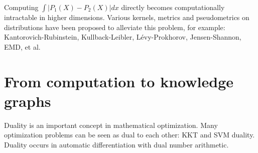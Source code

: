 \documentclass[11pt]{article}
\begin{document}
    \begin{figure}[!h]
    \centering
    \end{figure}

    \noindent Computing $\int |P_1(X) - P_2(X)| dx$ directly becomes computationally intractable in higher dimensions. Various kernels, metrics and pseudometrics on distributions have been proposed to alleviate this problem, for example: Kantorovich-Rubinstein, Kullback-Leibler, L\'evy-Prokhorov, Jensen-Shannon, EMD, et al.

    \pagebreak

    \section{From computation to knowledge graphs}\label{sec:graphs}


    Duality is an important concept in mathematical optimization. Many optimization problems can be seen as dual to each other: KKT and SVM duality. Duality occurs in automatic differentiation with dual number arithmetic.
\end{document}
